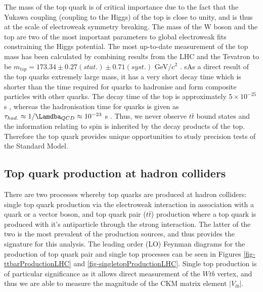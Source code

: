 The mass of the top quark is of critical importance due to the fact that the Yukawa coupling (coupling to the Higgs) of the top is close to unity, and is thus at the scale of electroweak symmetry breaking. The mass of the W boson and the top are two of the most important parameters to global electroweak fits constraining the Higgs potential. The most up-to-date measurement of the top mass has been calculated by combining results from the LHC and the Tevatron to be $m_{top} = 173.34 \pm 0.27(stat.) \pm 0.71(syst.)$ GeV/c$^2$ \cite{ATLAS:2014wva}. sAs a direct result of the top quarks extremely large mass, it has a very short decay time which is shorter than the time required for quarks to hadronise and form composite particles with other quarks. The decay time of the top is approximately $5 \times 10^{-25}$ s \cite{Quadt:2007jk}, whereas the hadronisation time for quarks is given as $\tau_{had.} \approx 1/\Lamdba_{QCD} \approx 10^{-23}$ s \cite{0954-3899-37-7A-075021}. Thus, we never observe $t\bar{t}$ bound states and the information relating to spin is inherited by the decay products of the top. Therefore the top quark provides unique opportunities to study precision tests of the Standard Model.


\subsection{Top quark production at hadron colliders} \label{subsec-TopProduction}

There are two processes whereby top quarks are produced at hadron colliders: single top quark production via the electroweak interaction in association with a quark or a vector boson, and top quark pair ($t\bar{t}$) production where a top quark is produced with it's antiparticle through the strong interaction. The latter of the two is the most prevalent of the production sources, and thus provides the signature for this analysis. The leading order (LO) Feynman diagrams for the production of top quark pair and single top processes can be seen in Figures \ref{fig-ttbarProductionLHC} and \ref{fig-singletopProductionLHC}. Single top production is of particular significance as it allows direct measurement of the $Wtb$ vertex, and thus we are able to measure the magnitude of the CKM matrix element $|V_{tb}|$.

